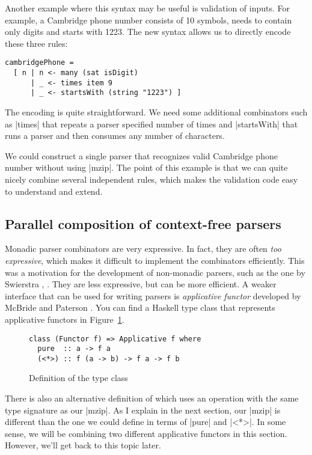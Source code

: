 \documentclass{tmr}
\begin{document}
Another example where this syntax may be useful is validation of inputs. For example, a Cambridge
phone number consists of 10 symbols, needs to contain only digits and starts with 1223. The new
syntax allows us to directly encode these three rules:

\begin{verbatim}
cambridgePhone = 
  [ n | n <- many (sat isDigit)
      | _ <- times item 9 
      | _ <- startsWith (string "1223") ]
\end{verbatim}
The encoding is quite straightforward. We need some additional combinators such as |times| that
repeats a parser specified number of times and |startsWith| that runs a parser and then consumes
any number of characters. 

We could construct a single parser that recognizes valid Cambridge phone number without using
|mzip|. The point of this example is that we can quite nicely combine several independent rules,
which makes the validation code easy to understand and extend.


\subsection{Parallel composition of context-free parsers}

Monadic parser combinators are very expressive. In fact, they are often \textit{too expressive}, 
which makes it difficult to implement the combinators efficiently. This was a motivation for
the development of non-monadic parsers, such as the one by Swierstra \cite{deterparser}, 
\cite{parsingtutorial}. They are less expressive, but can be more efficient.  
A weaker interface that can be used for writing parsers is \textit{applicative functor} developed 
by McBride and Paterson \cite{applicative}. You can find a Haskell type class 
that represents applicative functors in Figure~\ref{fig:applicative}.
\begin{figure}
\begin{verbatim}
class (Functor f) => Applicative f where
  pure  :: a -> f a
  (<*>) :: f (a -> b) -> f a -> f b
\end{verbatim}
\caption{Definition of the  type class}
\label{fig:applicative}
\end{figure}

There is also an alternative definition of  which uses an operation with 
the same type signature as our |mzip|. As I explain in the next section, our |mzip| is different
than the one we could define in terms of |pure| and |<*>|. In some sense, we will be combining
two different applicative functors in this section. However, we'll get back to this topic later.
\end{document}

